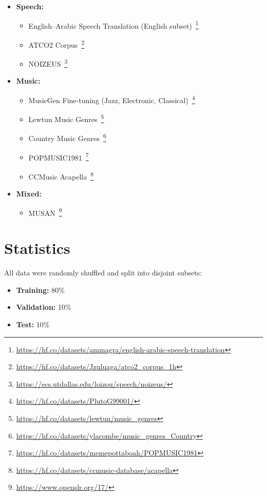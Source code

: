 \begin{itemize}
    \item \textbf{Speech:}
    \begin{itemize}
        \item English--Arabic Speech Translation (English subset)~\footnote{\url{https://hf.co/datasets/ammagra/english-arabic-speech-translation}}
        \item ATCO2 Corpus~\footnote{\url{https://hf.co/datasets/Jzuluaga/atco2_corpus_1h}}
        \item NOIZEUS~\footnote{\url{https://ecs.utdallas.edu/loizou/speech/noizeus/}}
    \end{itemize}

    \item \textbf{Music:}
    \begin{itemize}
        \item MusicGen Fine-tuning (Jazz, Electronic, Classical)~\footnote{\url{https://hf.co/datasets/PlutoG99001/}}
        \item Lewtun Music Genres~\footnote{\url{https://hf.co/datasets/lewtun/music_genres}}
        \item Country Music Genres~\footnote{\url{https://hf.co/datasets/ylacombe/music_genres_Country}}
        \item POPMUSIC1981~\footnote{\url{https://hf.co/datasets/memepottaboah/POPMUSIC1981}}
        \item CCMusic Acapella~\footnote{\url{https://hf.co/datasets/ccmusic-database/acapella}}
    \end{itemize}

    \item \textbf{Mixed:}
    \begin{itemize}
        \item MUSAN~\footnote{\url{https://www.openslr.org/17/}}
    \end{itemize}
\end{itemize}

\section{Statistics}
\label{sec:dataset_statistics}
All data were randomly shuffled and split into disjoint subsets:

\begin{itemize}
    \item \textbf{Training:} 80\%
    \item \textbf{Validation:} 10\%
    \item \textbf{Test:} 10\%
\end{itemize}




